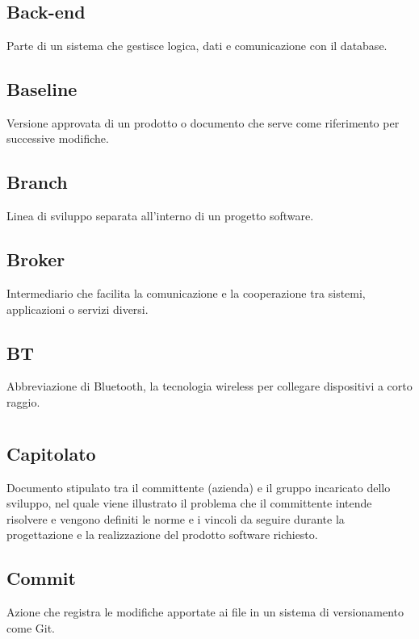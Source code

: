 \documentclass[a4paper,12pt]{article}
\begin{document}
      
\newpage
        \section{}
        
          \subsection*{Back-end}
			Parte di un sistema che gestisce logica, dati e comunicazione con il database.
          \subsection*{Baseline}
			Versione approvata di un prodotto o documento che serve come riferimento per successive modifiche.
          \subsection*{Branch}
			Linea di sviluppo separata all'interno di un progetto software.
          \subsection*{Broker}
			Intermediario che facilita la comunicazione e la cooperazione tra sistemi, applicazioni o servizi diversi.
          \subsection*{BT}
			Abbreviazione di Bluetooth, la tecnologia wireless per collegare dispositivi a corto raggio.
        
      

      
\newpage      
        \section{}
        
          \subsection*{Capitolato}
			Documento stipulato tra il committente (azienda) e il gruppo incaricato dello sviluppo, nel quale viene illustrato il problema che il committente intende risolvere e vengono definiti le norme e i vincoli da seguire durante la progettazione e la realizzazione del prodotto software richiesto. 
          \subsection*{Commit}
			Azione che registra le modifiche apportate ai file in un sistema di versionamento come Git.
\end{document}
